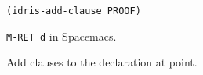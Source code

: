 {
  \texttt{(idris-add-clause PROOF)}

  \texttt{M-RET d} in Spacemacs.

  Add clauses to the declaration at point.
}
